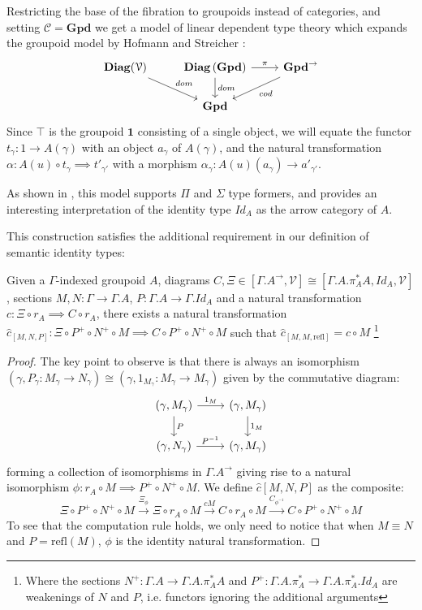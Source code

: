 \documentclass[a4paper,english]{lipics-v2018}
\DeclareMathOperator{\diag}{\mathbf{Diag}}
\begin{document}
Restricting the base of the fibration to groupoids instead of categories, and setting $\mathcal{C} = \mathbf{Gpd}$ we get a model of linear dependent type theory which expands the groupoid model by Hofmann and Streicher \cite{hofmann1998}:
\[
\begin{tikzcd}
\diag(\mathcal{V}) \ar[rd, "dom"]  & \diag{\mathbf{(Gpd)}} \ar[d, "dom"] \ar[r, "\pi"] & \mathbf{Gpd}^\to \ar[ld, "cod"] \\
& \mathbf{Gpd}
\end{tikzcd}
\]
Since $\top$ is the groupoid $\mathbf{1}$ consisting of a single object, we will equate the functor $t_\gamma : 1 \to A(\gamma)$ with an object $a_\gamma$ of $A(\gamma)$, and the natural transformation $\alpha : A(u) \circ t_\gamma \implies t'_{\gamma'}$ with a morphism $\alpha_\gamma : A(u)(a_\gamma) \to a'_{\gamma'}$.

As shown in \cite{hofmann1998}, this model supports $\Pi$ and $\Sigma$ type formers, and provides an interesting interpretation of the identity type $Id_A$ as the arrow category of $A$.

This construction satisfies the additional requirement in our definition of semantic identity types:
\begin{theorem}Given a $\Gamma$-indexed groupoid $A$, diagrams $C, \Xi \in [\Gamma.A^\to, \mathcal{V}] \cong [\Gamma.A.\pi_A^*A,Id_A, \mathcal{V}]$, sections $M, N : \Gamma \to \Gamma.A$, $P : \Gamma.A \to \Gamma.Id_A$ and a natural transformation $c : \Xi \circ r_A \implies C\circ r_A$, there exists a natural transformation $\hat c_{[M,N,P]} : \Xi \circ P^+ \circ N^+ \circ M \implies C \circ P^+ \circ N^+ \circ M$ such that $\hat c_{[M,M,\text{refl}]} = c \circ M$ \footnote{Where the sections $N^+ : \Gamma.A \to \Gamma.A.\pi_A^*A$ and $P^+ : \Gamma.A.\pi_A^* \to \Gamma.A.\pi_A^*.Id_A$ are weakenings of $N$ and $P$, i.e. functors ignoring the additional arguments}
  \begin{proof}
    The key point to observe is that there is always an isomorphism $(\gamma, P_\gamma : M_\gamma \to N_\gamma) \cong (\gamma, 1_{M_\gamma} : M_\gamma \to M_\gamma)$ given by the commutative diagram:
    \[
      \begin{tikzcd}
      (\gamma, M_\gamma) \ar[d, "P"] \ar[r, "1_M"] & (\gamma, M_\gamma) \ar[d, "1_M"]\\
      (\gamma, N_\gamma) \ar[r, "P^{-1}"] & (\gamma, M_\gamma)
      \end{tikzcd}
    \]
    forming a collection of isomorphisms in $\Gamma.A^\to$ giving rise to a natural isomorphism $\phi : r_A \circ M \implies P^+ \circ N^+ \circ M$. We define $\hat c[M,N,P]$ as the composite:
\[
\Xi \circ P^+ \circ N^+ \circ M \xrightarrow{\Xi_{\phi}} \Xi \circ r_A \circ M \xrightarrow{cM} C \circ r_A \circ M \xrightarrow{C_{\phi^{-1}}} C \circ P^+ \circ N^+ \circ M
\]
To see that the computation rule holds, we only need to notice that when $M \equiv N$ and $P = \text{refl}(M)$, $\phi$ is the identity natural transformation.
\end{proof}
\end{theorem}
\end{document}
